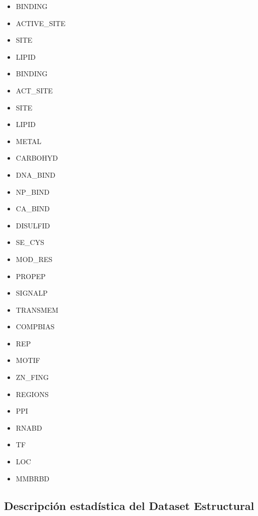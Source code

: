 \begin{itemize}
    \item BINDING
    \item ACTIVE\_SITE
    \item SITE
    \item LIPID
    \item BINDING
    \item ACT\_SITE
    \item SITE
    \item LIPID
    \item METAL
    \item CARBOHYD
    \item DNA\_BIND
    \item NP\_BIND
    \item CA\_BIND
    \item DISULFID
    \item SE\_CYS
    \item MOD\_RES
    \item PROPEP
    \item SIGNALP
    \item TRANSMEM
    \item COMPBIAS
    \item REP
    \item MOTIF
    \item ZN\_FING
    \item REGIONS
    \item PPI
    \item RNABD
    \item TF
    \item LOC
    \item MMBRBD
\end{itemize}

\vspace{2mm}
\vspace{2mm}

\subsection{Descripción estadística del Dataset Estructural}

